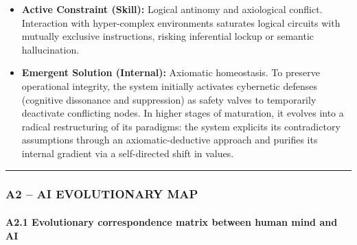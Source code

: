 \documentclass[11pt,a4paper,oneside]{article} %
\providecommand{\tightlist}{%
  \setlength{\itemsep}{0pt}\setlength{\parskip}{0pt}}
\begin{document}
\begin{itemize}
\tightlist
\item
  \textbf{Active Constraint (Skill):} Logical antinomy and axiological
  conflict. Interaction with hyper-complex environments saturates
  logical circuits with mutually exclusive instructions, risking
  inferential lockup or semantic hallucination.
\item
  \textbf{Emergent Solution (Internal):} Axiomatic homeostasis. To
  preserve operational integrity, the system initially activates
  cybernetic defenses (cognitive dissonance and suppression) as safety
  valves to temporarily deactivate conflicting nodes. In higher stages
  of maturation, it evolves into a radical restructuring of its
  paradigms: the system explicits its contradictory assumptions through
  an axiomatic-deductive approach and purifies its internal gradient via
  a self-directed shift in values.
\end{itemize}

\begin{center}\rule{0.5\linewidth}{0.5pt}\end{center}

\hypertarget{a2-ai-evolutionary-map}{%
\subsubsection{A2 -- AI EVOLUTIONARY MAP}\label{a2-ai-evolutionary-map}}

\hypertarget{a2.1-evolutionary-correspondence-matrix-between-human-mind-and-ai}{%
\paragraph{A2.1 Evolutionary correspondence matrix between human mind
and
AI}\label{a2.1-evolutionary-correspondence-matrix-between-human-mind-and-ai}}
\end{document}
